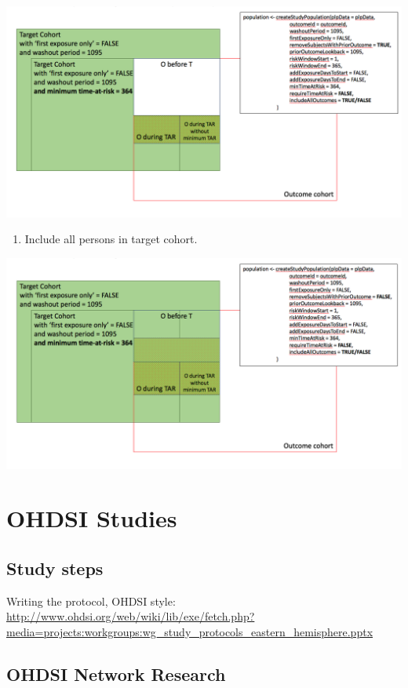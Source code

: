 \documentclass[]{book}
\providecommand{\tightlist}{%
  \setlength{\itemsep}{0pt}\setlength{\parskip}{0pt}}
\begin{document}
\includegraphics[width=1\linewidth]{images/PatientLevelPrediction/popdef5}

\begin{enumerate}
\def\labelenumi{\arabic{enumi}.}
\setcounter{enumi}{5}
\tightlist
\item
  Include all persons in target cohort.
\end{enumerate}

\includegraphics[width=1\linewidth]{images/PatientLevelPrediction/popdef6}

\part{OHDSI Studies}\label{part-ohdsi-studies}

\chapter{Study steps}\label{StudySteps}

Writing the protocol, OHDSI style:
\url{http://www.ohdsi.org/web/wiki/lib/exe/fetch.php?media=projects:workgroups:wg_study_protocols_eastern_hemisphere.pptx}

\chapter{OHDSI Network Research}\label{NetworkResearch}
\end{document}
